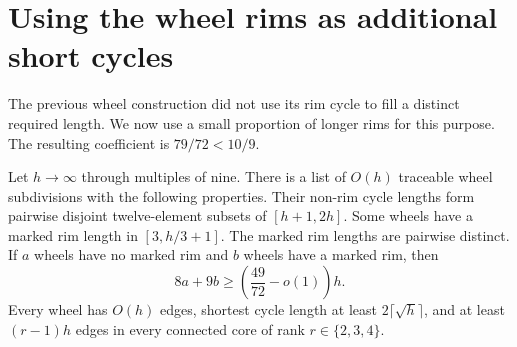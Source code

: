\section{Using the wheel rims as additional short cycles}
\label{sec:rhost-seventy-nine}

The previous wheel construction did not use its rim cycle to fill a distinct required length.
We now use a small proportion of longer rims for this purpose.
The resulting coefficient is $79/72<10/9$.

\begin{lemma}\label{lem:rhost-wheel-profit}
Let $h\to\infty$ through multiples of nine.
There is a list of $O(h)$ traceable wheel subdivisions with the following properties.
Their non-rim cycle lengths form pairwise disjoint twelve-element subsets of $[h+1,2h]$.
Some wheels have a marked rim length in $[3,h/3+1]$.
The marked rim lengths are pairwise distinct.
If $a$ wheels have no marked rim and $b$ wheels have a marked rim, then
\[
 8a+9b\ge\left(\frac{49}{72}-o(1)\right)h.
\]
Every wheel has $O(h)$ edges, shortest cycle length at least $2\lceil\sqrt h\rceil$,
and at least $(r-1)h$ edges in every connected core of rank $r\in\{2,3,4\}$.
\end{lemma}

